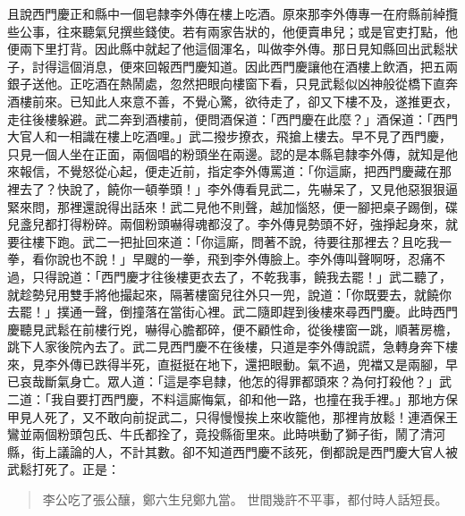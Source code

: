 且說西門慶正和縣中一個皂隸李外傳在樓上吃酒。原來那李外傳專一在府縣前綽攬些公事，往來聽氣兒撰些錢使。若有兩家告狀的，他便賣串兒；或是官吏打點，他便兩下里打背。因此縣中就起了他這個渾名，叫做李外傳。那日見知縣回出武鬆狀子，討得這個消息，便來回報西門慶知道。因此西門慶讓他在酒樓上飲酒，把五兩銀子送他。正吃酒在熱鬧處，忽然把眼向樓窗下看，只見武鬆似凶神般從橋下直奔酒樓前來。已知此人來意不善，不覺心驚，欲待走了，卻又下樓不及，遂推更衣，走往後樓躲避。武二奔到酒樓前，便問酒保道：「西門慶在此麼？」酒保道：「西門大官人和一相識在樓上吃酒哩。」武二撥步撩衣，飛搶上樓去。早不見了西門慶，只見一個人坐在正面，兩個唱的粉頭坐在兩邊。認的是本縣皂隸李外傳，就知是他來報信，不覺怒從心起，便走近前，指定李外傳罵道：「你這廝，把西門慶藏在那裡去了？快說了，饒你一頓拳頭！」李外傳看見武二，先嚇呆了，又見他惡狠狠逼緊來問，那裡還說得出話來！武二見他不則聲，越加惱怒，便一腳把桌子踢倒，碟兒盞兒都打得粉碎。兩個粉頭嚇得魂都沒了。李外傳見勢頭不好，強掙起身來，就要往樓下跑。武二一把扯回來道：「你這廝，問著不說，待要往那裡去？且吃我一拳，看你說也不說！」早颼的一拳，飛到李外傳臉上。李外傳叫聲啊呀，忍痛不過，只得說道：「西門慶才往後樓更衣去了，不乾我事，饒我去罷！」武二聽了，就趁勢兒用雙手將他撮起來，隔著樓窗兒往外只一兜，說道：「你既要去，就饒你去罷！」撲通一聲，倒撞落在當街心裡。武二隨即趕到後樓來尋西門慶。此時西門慶聽見武鬆在前樓行兇，嚇得心膽都碎，便不顧性命，從後樓窗一跳，順著房檐，跳下人家後院內去了。武二見西門慶不在後樓，只道是李外傳說謊，急轉身奔下樓來，見李外傳已跌得半死，直挺挺在地下，還把眼動。氣不過，兜襠又是兩腳，早已哀哉斷氣身亡。眾人道：「這是李皂隸，他怎的得罪都頭來？為何打殺他？」武二道：「我自要打西門慶，不料這廝悔氣，卻和他一路，也撞在我手裡。」那地方保甲見人死了，又不敢向前捉武二，只得慢慢挨上來收籠他，那裡肯放鬆！連酒保王鸞並兩個粉頭包氏、牛氏都拴了，竟投縣衙里來。此時哄動了獅子街，鬧了清河縣，街上議論的人，不計其數。卻不知道西門慶不該死，倒都說是西門慶大官人被武鬆打死了。正是：
\begin{quote}
李公吃了張公釀，鄭六生兒鄭九當。
世間幾許不平事，都付時人話短長。
\end{quote}
